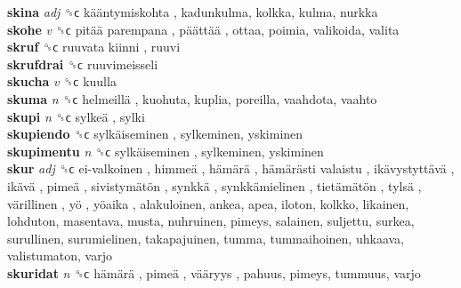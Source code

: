 \textbf{skina} \emph{adj}  ␝ϲ   kääntymiskohta , kadunkulma, kolkka, kulma, nurkka  \\
\textbf{skohe} \emph{v}  ␝ϲ   pitää parempana ,  päättää , ottaa, poimia, valikoida, valita  \\
\textbf{skruf} ␝ϲ   ruuvata kiinni , ruuvi  \\
\textbf{skrufdrai} ␝ϲ  ruuvimeisseli  \\
\textbf{skucha} \emph{v}  ␝ϲ  kuulla  \\
\textbf{skuma} \emph{n}  ␝ϲ   helmeillä , kuohuta, kuplia, poreilla, vaahdota, vaahto  \\
\textbf{skupi} \emph{n}  ␝ϲ   sylkeä , sylki  \\
\textbf{skupiendo} ␝ϲ   sylkäiseminen , sylkeminen, yskiminen  \\
\textbf{skupimentu} \emph{n}  ␝ϲ   sylkäiseminen , sylkeminen, yskiminen  \\
\textbf{skur} \emph{adj}  ␝ϲ   ei-valkoinen ,  himmeä ,  hämärä ,  hämärästi valaistu ,  ikävystyttävä ,  ikävä ,  pimeä ,  sivistymätön ,  synkkä ,  synkkämielinen ,  tietämätön ,  tylsä ,  värillinen ,  yö ,  yöaika , alakuloinen, ankea, apea, iloton, kolkko, likainen, lohduton, masentava, musta, nuhruinen, pimeys, salainen, suljettu, surkea, surullinen, surumielinen, takapajuinen, tumma, tummaihoinen, uhkaava, valistumaton, varjo  \\
\textbf{skuridat} \emph{n}  ␝ϲ   hämärä ,  pimeä ,  vääryys , pahuus, pimeys, tummuus, varjo  \\
